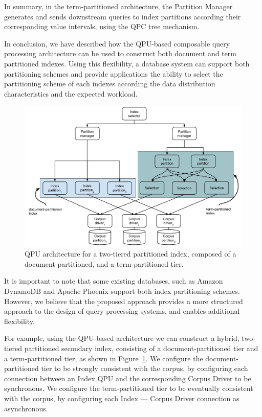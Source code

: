 In summary, in the term-partitioned architecture,
the Partition Manager generates and sends downstream queries to index partitions according their corresponding
value intervals, using the QPC tree mechanism.

\bigskip
\noindent
In conclusion, we have described how the QPU-based composable query processing architecture can be used to construct both
document and term partitioned indexes.
Using this flexibility, a database system can support both partitioning schemes and provide applications the ability to
select the partitioning scheme of each indexes according the data distribution characteristics and the expected workload.

\begin{figure}
  \centering
    \includegraphics[width=\textwidth]{./figures/case_studies/index_partitioned_two_level.pdf}
  \caption{QPU architecture for a two-tiered partitioned index, composed of a document-partitioned, and a term-partitioned tier.}
  \label{fig:index_partitioned_two_level}
\end{figure}

It is important to note that some existing databases,
such as Amazon DynamoDB \cite{dynamodb:secondaryindexes} and Apache Phoenix \cite{phoenix:secondaryidnexing}
support both index partitioning schemes.
However, we believe that the proposed approach provides a more structured approach to the design of query processing systems,
and enables additional flexibility.

\medskip
\noindent
For example, using the QPU-based architecture we can construct a hybrid, two-tiered partitioned secondary index,
consisting of a document-partitioned tier and a term-partitioned tier, as shown in Figure~\ref{fig:index_partitioned_two_level}.
We configure the document-partitioned tier to be strongly consistent with the corpus,
by configuring each connection between an Index QPU and the corresponding Corpus Driver to be synchronous.
We configure the term-partitioned tier to be eventually consistent with the corpus,
by configuring each Index --- Corpus Driver connection as asynchronous.

